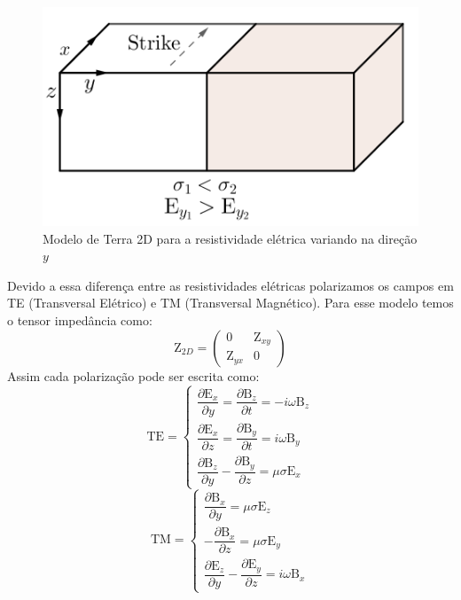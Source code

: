 	    \begin{figure}[H]
	        \caption{Modelo de Terra 2D para a resistividade elétrica variando na direção $y$}
	        \begin{center}
	        \includegraphics[width=12cm]{texto/fig/Tm_Te.png} 
	        \end{center}
		\label{fig_strike}
	    \end{figure}
	    Devido a essa diferença entre as resistividades elétricas polarizamos os campos em TE (Transversal Elétrico) e TM (Transversal Magnético).
	    Para esse modelo temos o tensor impedância como:
	    \begin{equation}
	     \textrm{Z}_{2D} = \left (\begin{array}{cc}
	                               0 & \textrm{Z}_{xy} \\
	                               \textrm{Z}_{yx} & 0
	                              \end{array} \right)
	    \end{equation}
	    Assim cada polarização pode ser escrita como:
	    \begin{equation}
	     \textrm{TE} = \left \{ \begin{array}{l}
	            \dfrac{\partial \textrm{E}_x}{\partial y} = \dfrac{\partial \textrm{B}_z}{\partial t} = -i\omega \textrm{B}_z \\[10pt]
	           \dfrac{\partial \textrm{E}_x}{\partial z} = \dfrac{\partial \textrm{B}_y}{\partial t} = i\omega \textrm{B}_y \\[10pt]
	           \dfrac{\partial \textrm{B}_z}{\partial y} - \dfrac{\partial \textrm{B}_y}{\partial z} = \mu \sigma \textrm{E}_x 
	           \end{array} \right.
	    \end{equation}
	    \begin{equation}
	     \textrm{TM} = \left \{ \begin{array}{l}
	            \dfrac{\partial \textrm{B}_x}{\partial y} = \mu \sigma \textrm{E}_z \\[10pt]
	           -\dfrac{\partial \textrm{B}_x}{\partial z} = \mu \sigma \textrm{E}_y \\[10pt]
	           \dfrac{\partial \textrm{E}_z}{\partial y} - \dfrac{\partial \textrm{E}_y}{\partial z} = i \omega \textrm{B}_x 
	           \end{array} \right.
	    \end{equation}
        
